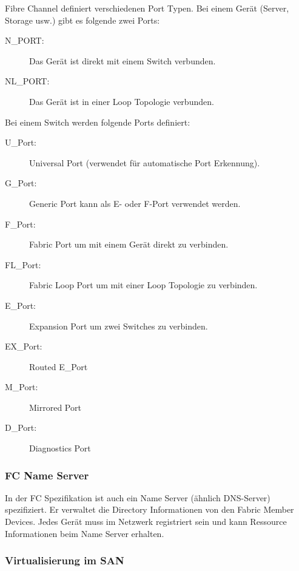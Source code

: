 Fibre Channel definiert verschiedenen Port Typen. Bei einem Gerät (Server, Storage usw.) gibt es folgende zwei Ports:
\begin{description}
	\item[N\_PORT:] Das Gerät ist direkt mit einem Switch verbunden.
	\item[NL\_PORT:] Das Gerät ist in einer Loop Topologie verbunden.
\end{description}
Bei einem Switch werden folgende Ports definiert:
\begin{description}
	\item[U\_Port:] Universal Port (verwendet für automatische Port Erkennung).
	\item[G\_Port:] Generic Port kann als E- oder F-Port verwendet werden.
	\item[F\_Port:] Fabric Port um mit einem Gerät direkt zu verbinden.
	\item[FL\_Port:] Fabric Loop Port um mit einer Loop Topologie zu verbinden.
	\item[E\_Port:] Expansion Port um zwei Switches zu verbinden.
	\item[EX\_Port:] Routed E\_Port
	\item[M\_Port:] Mirrored Port
	\item[D\_Port:] Diagnostics Port
\end{description}

\subsubsection{FC Name Server}

In der FC Spezifikation ist auch ein Name Server (ähnlich DNS-Server) spezifiziert. Er verwaltet die Directory Informationen von den Fabric Member Devices. Jedes Gerät muss im Netzwerk registriert sein und kann Ressource Informationen beim Name Server erhalten.

\subsubsection{Virtualisierung im SAN}

